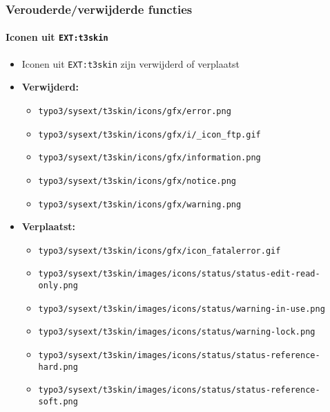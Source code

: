 
\begin{frame}[fragile]
	\frametitle{Verouderde/verwijderde functies}
	\framesubtitle{Iconen uit \texttt{EXT:t3skin}}

	\begin{itemize}

		\item Iconen uit \texttt{EXT:t3skin} zijn verwijderd of verplaatst
		\item \textbf{Verwijderd:}

			\begin{itemize}
				\item \smaller\texttt{typo3/sysext/t3skin/icons/gfx/error.png}
				\item \texttt{typo3/sysext/t3skin/icons/gfx/i/\_icon\_ftp.gif}
				\item \texttt{typo3/sysext/t3skin/icons/gfx/information.png}
				\item \texttt{typo3/sysext/t3skin/icons/gfx/notice.png}
				\item \texttt{typo3/sysext/t3skin/icons/gfx/warning.png}
			\end{itemize}

		\item \textbf{Verplaatst:}

			\begin{itemize}
				\item \smaller\texttt{typo3/sysext/t3skin/icons/gfx/icon\_fatalerror.gif}
				\item \texttt{typo3/sysext/t3skin/images/icons/status/status-edit-read-only.png}
				\item \texttt{typo3/sysext/t3skin/images/icons/status/warning-in-use.png}
				\item \texttt{typo3/sysext/t3skin/images/icons/status/warning-lock.png}
				\item \texttt{typo3/sysext/t3skin/images/icons/status/status-reference-hard.png}
				\item \texttt{typo3/sysext/t3skin/images/icons/status/status-reference-soft.png}
			\end{itemize}

	\end{itemize}

\end{frame}

